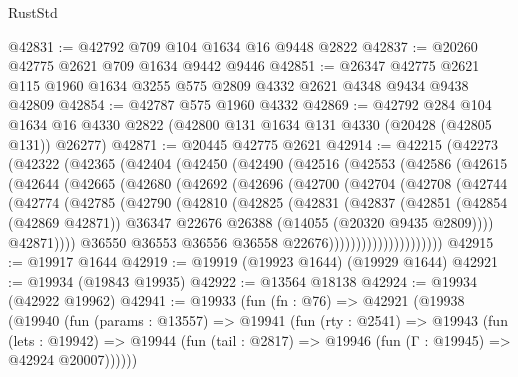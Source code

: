 \begin{lexlean}{RustStd}
\begin{coremodule}
@42831 := @42792 @709 @104 @1634 @16 @9448 @2822
@42837 := @20260 @42775 @2621 @709 @1634 @9442 @9446
@42851 := @26347 @42775 @2621 @115 @1960 @1634 @3255 @575 @2809 @4332 @2621 @4348 @9434 @9438 @42809
@42854 := @42787 @575 @1960 @4332
@42869 := @42792
    @284
    @104
    @1634
    @16
    @4330
    @2822
    (@42800 @131 @1634 @131 @4330 (@20428 (@42805 @131)) @26277)
@42871 := @20445 @42775 @2621
@42914 := @42215
    (@42273
      (@42322
        (@42365
          (@42404
            (@42450
              (@42490
                (@42516
                  (@42553
                    (@42586
                      (@42615
                        (@42644
                          (@42665
                            (@42680
                              (@42692
                                (@42696
                                  (@42700
                                    (@42704
                                      (@42708
                                        (@42744
                                          (@42774
                                            (@42785
                                              (@42790
                                                (@42810
                                                  (@42825
                                                    (@42831
                                                      (@42837
                                                        (@42851
                                                          (@42854 (@42869 @42871))
                                                          @36347
                                                          @22676
                                                          @26388
                                                          (@14055 (@20320 @9435 @2809))))
                                                      @42871))))
                                              @36550
                                              @36553
                                              @36556
                                              @36558
                                              @22676)))))))))))))))))))))
@42915 := @19917 @1644
@42919 := @19919 (@19923 @1644) (@19929 @1644)
@42921 := @19934 (@19843 @19935)
@42922 := @13564 @18138
@42924 := @19934 (@42922 @19962)
@42941 := @19933
    (fun (fn : @76) =>
    @42921
      (@19938
        (@19940
          (fun (params : @13557) =>
          @19941
            (fun (rty : @2541) =>
            @19943
              (fun (lets : @19942) =>
              @19944 (fun (tail : @2817) => @19946 (fun (Γ : @19945) => @42924 @20007))))))

\end{coremodule}
\end{lexlean}
